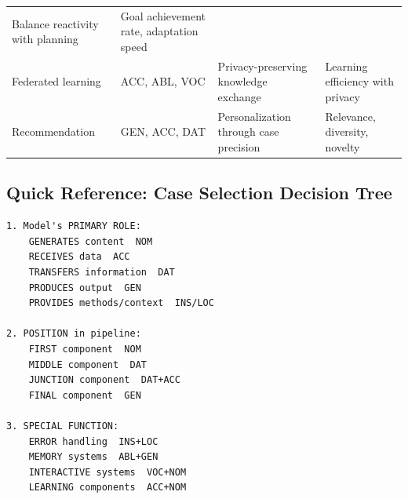 \documentclass[
  11pt,
  letterpaper,
]{article}
\begin{document}
\begin{longtable}[]{@{}llll@{}}
\begin{minipage}[t]{0.33\columnwidth}
Balance reactivity with planning\strut
\end{minipage} & \begin{minipage}[t]{0.22\columnwidth}\raggedright
Goal achievement rate, adaptation speed\strut
\end{minipage}\tabularnewline
\begin{minipage}[t]{0.18\columnwidth}\raggedright
Federated learning\strut
\end{minipage} & \begin{minipage}[t]{0.15\columnwidth}\raggedright
ACC, ABL, VOC\strut
\end{minipage} & \begin{minipage}[t]{0.33\columnwidth}\raggedright
Privacy-preserving knowledge exchange\strut
\end{minipage} & \begin{minipage}[t]{0.22\columnwidth}\raggedright
Learning efficiency with privacy\strut
\end{minipage}\tabularnewline
\begin{minipage}[t]{0.18\columnwidth}\raggedright
Recommendation\strut
\end{minipage} & \begin{minipage}[t]{0.15\columnwidth}\raggedright
GEN, ACC, DAT\strut
\end{minipage} & \begin{minipage}[t]{0.33\columnwidth}\raggedright
Personalization through case precision\strut
\end{minipage} & \begin{minipage}[t]{0.22\columnwidth}\raggedright
Relevance, diversity, novelty\strut
\end{minipage}\tabularnewline
\bottomrule
\end{longtable}

\hypertarget{quick-reference-case-selection-decision-tree}{%
\subsection{Quick Reference: Case Selection Decision
Tree}\label{quick-reference-case-selection-decision-tree}}

\begin{verbatim}
1. Model's PRIMARY ROLE:
    GENERATES content  NOM
    RECEIVES data  ACC
    TRANSFERS information  DAT
    PRODUCES output  GEN
    PROVIDES methods/context  INS/LOC

2. POSITION in pipeline:
    FIRST component  NOM
    MIDDLE component  DAT
    JUNCTION component  DAT+ACC
    FINAL component  GEN
   
3. SPECIAL FUNCTION:
    ERROR handling  INS+LOC
    MEMORY systems  ABL+GEN
    INTERACTIVE systems  VOC+NOM
    LEARNING components  ACC+NOM
\end{verbatim}
\end{document}
